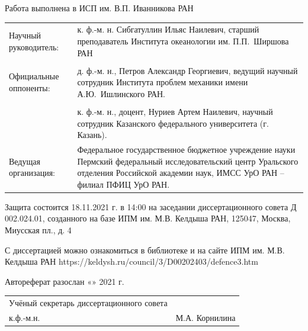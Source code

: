 \documentclass[utf8x]{G7-32} %
\begin{document}
\newpage
\pagestyle{empty}
\begin{spacing}{1.2}
\pagestyle{empty}
\begin{flushleft}
  Работа выполнена в ИСП им. В.П. Иванникова РАН
\end{flushleft}
\pagestyle{empty}
\begin{flushleft}
\begin{tabular}{p{5.8cm} p{10.5cm}}
    Научный руководитель: & к. ф.-м. н. Сибгатуллин Ильяс Наилевич, старший преподаватель Института океанологии им. П.П.~Ширшова РАН  \\

    \\

    Официальные оппоненты: &  д. ф.-м. н., Петров Александр Георгиевич, ведущий научный сотрудник Института проблем механики имени А.Ю.~Ишлинского РАН. \\

    \\

    & к. ф.-м. н., доцент, Нуриев Артем Наилевич, научный сотрудник Казанского федерального университета (г. Казань).
    
    \\

    Ведущая организация: & Федеральное государственное бюджетное учреждение науки Пермский  федеральный  исследовательский  центр  Уральского  отделения Российской академии наук, ИМСС УрО РАН – филиал ПФИЦ УрО РАН.
    
\end{tabular}
\end{flushleft}

\begin{flushleft}
    Защита состоится 18.11.2021 г. в 14:00 на заседании диссертационного совета Д 002.024.01, созданного на базе ИПМ им. М.В. Келдыша РАН, 125047, Москва, Миусская пл., д. 4

    \setlength{\parskip}{1em}

    С диссертацией можно ознакомиться в библиотеке и на сайте ИПМ им. М.В. Келдыша РАН https://keldysh.ru/council/3/D00202403/defence3.htm

    \vspace{1cm}
    Автореферат разослан «\underline{\hspace{1cm}}» \underline{\hspace{4cm}} 2021 г.    
\end{flushleft}
\vspace{1cm}
\setlength{\parskip}{1em}
\begin{flushleft}
    \begin{tabular}{p{10cm} p{5cm}}

        Учёный секретарь диссертационного совета \\ к.ф.-м.н.  
    & М.А. Корнилина  
        
    \end{tabular}
\end{flushleft}
\end{spacing}
\newpage
\end{document}
